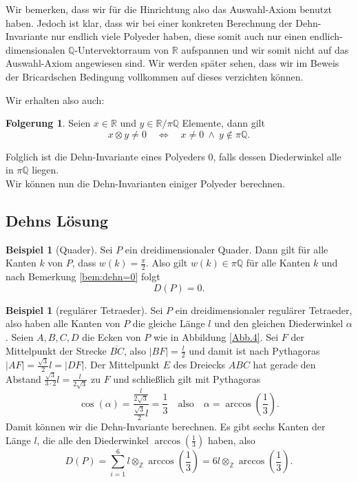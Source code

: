 \documentclass[11pt,titlepage]{article}
\newcommand{\setZ}{\mathbb{Z}}
\newcommand{\setQ}{\mathbb{Q}}
\newcommand{\setR}{\mathbb{R}}
\theoremstyle{definition}
\newtheorem{corollary}[theorem]{Folgerung}
\newtheorem{example}[theorem]{Beispiel}
\theoremstyle{remark}
\begin{document}
	Wir bemerken, dass wir für die Hinrichtung also das Auswahl-Axiom 
	benutzt haben. Jedoch ist klar, dass wir bei einer konkreten Berechnung der 
	Dehn-Invariante nur endlich viele Polyeder haben, diese somit auch 
	nur einen endlich-dimensionalen $\setQ$-Untervektorraum von $\setR$ aufspannen und wir somit nicht auf das Auswahl-Axiom angewiesen sind. Wir 
	werden später sehen, dass wir im Beweis der Bricardschen Bedingung 
	vollkommen auf dieses verzichten können.
	
	Wir erhalten also auch:
	
	\begin{corollary}
		Seien $x\in\setR$ und $y\in\setR/\pi\setQ$ Elemente, dann gilt
		\[ x\otimes y\neq0\quad\Leftrightarrow\quad x\neq 0 \ \land\ y\notin\pi\setQ. \]
	\end{corollary}
	
	Folglich ist die Dehn-Invariante eines Polyeders $0$, falls dessen Diederwinkel alle in $\pi\setQ$ liegen. \\
	
	Wir können nun die Dehn-Invarianten einiger Polyeder berechnen.
	
	\subsection{Dehns Lösung}
	
	\begin{example}[Quader] \label{exp:quader}
		Sei $P$ ein dreidimensionaler Quader. Dann gilt für alle Kanten $k$ von $P$, dass $w(k)=\frac{\pi}{2}$. 
		Also gilt $w(k)\in \pi\setQ$ für alle Kanten $k$ und nach Bemerkung \ref{bem:dehn=0} folgt
		\[ D(P)=0. \]
	\end{example}
	
	\begin{example}[regulärer Tetraeder] \label{exp:regTetr}
		Sei $P$ ein dreidimensionaler regulärer Tetraeder, also haben alle Kanten von $P$ die gleiche Länge $l$ und 
		den gleichen Diederwinkel $\alpha$. Seien $A,B,C,D$ die Ecken von $P$ wie in Abbildung \ref{Abb.4}. 
		Sei $F$ der Mittelpunkt der Strecke $\overline{BC}$, also $|BF|=\frac{l}{2}$ und damit ist nach Pythagoras 
		$|AF|=\frac{\sqrt{3}}{2}l=|DF|$. Der Mittelpunkt $E$ des Dreiecks $ABC$ hat gerade den Abstand 
		$\frac{\sqrt{3}}{3 \cdot 2}l=\frac{l}{2\sqrt{3}}$ zu $F$ und schließlich gilt mit Pythagoras
		\[\cos(\alpha)=\frac{\frac{l}{2\sqrt{3}}}{\frac{\sqrt{3}}{2}l}=\frac{1}{3}\quad\text{also}
		\quad \alpha=\arccos\left(\frac{1}{3}\right). \]
		Damit können wir die Dehn-Invariante berechnen. Es gibt sechs Kanten der Länge $l$, die alle den 
		Diederwinkel $\arccos\left(\frac{1}{3}\right)$ haben, also
		\[ D(P)=\sum_{i=1}^6 l\otimes_{\setZ}\arccos\left(\frac{1}{3}\right)=6l\otimes_{\setZ}\arccos\left(\frac{1}{3}\right).\]
	\end{example}
	
\end{document}

